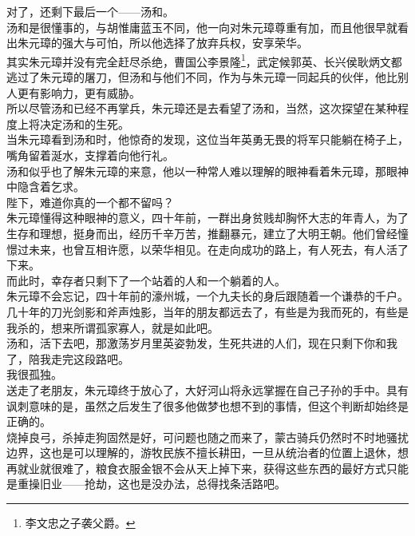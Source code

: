 \begin{multicols}{\theparacolNo}
对了，还剩下最后一个——汤和。\\

汤和是很懂事的，与胡惟庸蓝玉不同，他一向对朱元璋尊重有加，而且他很早就看出朱元璋的强大与可怕，所以他选择了放弃兵权，安享荣华。\\

其实朱元璋并没有完全赶尽杀绝，曹国公李景隆\footnote{李文忠之子袭父爵。}，武定候郭英、长兴侯耿炳文都逃过了朱元璋的屠刀，但汤和与他们不同，作为与朱元璋一同起兵的伙伴，他比别人更有影响力，更有威胁。\\

所以尽管汤和已经不再掌兵，朱元璋还是去看望了汤和，当然，这次探望在某种程度上将决定汤和的生死。\\

当朱元璋看到汤和时，他惊奇的发现，这位当年英勇无畏的将军只能躺在椅子上，嘴角留着涎水，支撑着向他行礼。\\

汤和似乎也了解朱元璋的来意，他以一种常人难以理解的眼神看着朱元璋，那眼神中隐含着乞求。\\

陛下，难道你真的一个都不留吗？\\

朱元璋懂得这种眼神的意义，四十年前，一群出身贫贱却胸怀大志的年青人，为了生存和理想，挺身而出，经历千辛万苦，推翻暴元，建立了大明王朝。他们曾经憧憬过未来，也曾互相许愿，以荣华相见。在走向成功的路上，有人死去，有人活了下来。\\

而此时，幸存者只剩下了一个站着的人和一个躺着的人。\\

朱元璋不会忘记，四十年前的濠州城，一个九夫长的身后跟随着一个谦恭的千户。\\

几十年的刀光剑影和斧声烛影，当年的朋友都远去了，有些是为我而死的，有些是我杀的，想来所谓孤家寡人，就是如此吧。\\

汤和，活下去吧，那激荡岁月里英姿勃发，生死共进的人们，现在只剩下你和我了，陪我走完这段路吧。\\

我很孤独。\\

送走了老朋友，朱元璋终于放心了，大好河山将永远掌握在自己子孙的手中。具有讽刺意味的是，虽然之后发生了很多他做梦也想不到的事情，但这个判断却始终是正确的。\\

烧掉良弓，杀掉走狗固然是好，可问题也随之而来了，蒙古骑兵仍然时不时地骚扰边界，这也是可以理解的，游牧民族不擅长耕田，一旦从统治者的位置上退休，想再就业就很难了，粮食衣服金银不会从天上掉下来，获得这些东西的最好方式只能是重操旧业——抢劫，这也是没办法，总得找条活路吧。\\


\end{multicols}
